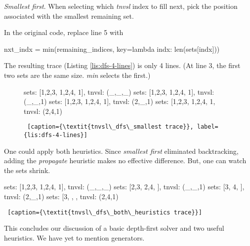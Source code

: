 \noindent\textit{Smallest first}. When selecting which \textit{tnvsl} index to fill next, pick the position associated with the smallest remaining set. 

In the original code, replace line 5 with
\begin{center}
\begin{minipage}[c]{0.45\textwidth}
\begin{python1}
 nxt_indx = min(remaining_indices,
                key=lambda indx: len(sets[indx]))
\end{python1}
\end{minipage}
\end{center}
The resulting trace (Listing \ref{lis:dfs-4-lines}) is only 4 lines. (At line 3, the first two sets are the same size. \textit{min} selects the first.) 

\begin{figure}[htb]
    \centering\begin{minipage}[c]{0.45\textwidth}
\begin{python1}  
sets: [{1,2,3}, {1,2,4}, {1}], tnvsl: (_,_,_)
  sets: [{1,2,3}, {1,2,4}, {1}], tnvsl: (_,_,1)
    sets: [{1,2,3}, {1,2,4}, {1}], tnvsl: (2,_,1)
      sets: [{1,2,3}, {1,2,4}, {1}, tnvsl: (2,4,1)
\end{python1}\linv
\begin{lstlisting} [caption={\textit{tnvsl\_dfs\_smallest trace}}, label={lis:dfs-4-lines}]
\end{lstlisting}\inv
\end{minipage}\linv
\end{figure}

One could apply both heuristics. Since \textit{smallest first} eliminated backtracking, adding the \textit{propagate} heuristic makes no effective difference. But, one can watch the sets shrink.

\midiumlv
\begin{minipage}[c]{0.45\textwidth}
\begin{python1} 
sets: [{1,2,3}, {1,2,4}, {1}], tnvsl: (_,_,_)
  sets: [{2,3}, {2,4}, {}], tnvsl: (_,_,1)
    sets: [{3}, {4}, {}], tnvsl: (2,_,1)
      sets: [{3}, {}, {}, tnvsl: (2,4,1)
\end{python1}\linv
\begin{lstlisting} [caption={\textit{tnvsl\_dfs\_both\_heuristics trace}}]
\end{lstlisting}
\end{minipage}

This concludes our discussion of a basic depth-first solver and two useful heuristics. We have yet to mention generators.


